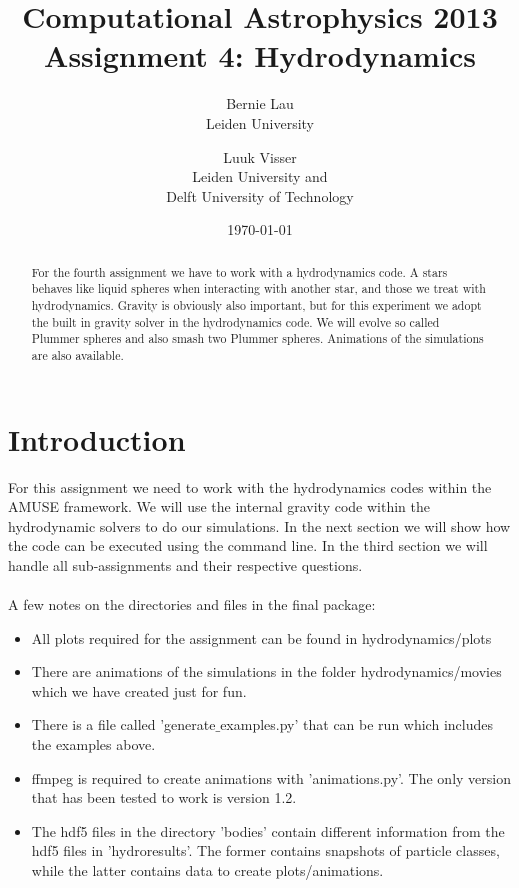 \documentclass[a4paper]{article}
\begin{document}
\title{Computational Astrophysics 2013 \\
Assignment 4: Hydrodynamics}
\author{Bernie Lau\\
        Leiden University
		\and
		Luuk Visser\\
		Leiden University and\\
        Delft University of Technology}
\date{\today}
\maketitle

\begin{abstract}
\centering
For the fourth assignment we have to work with a hydrodynamics code. A stars behaves like liquid spheres when interacting with another star, and those we treat with hydrodynamics. Gravity is obviously also important, but for this experiment we adopt the built in gravity solver in the hydrodynamics code. We will evolve so called Plummer spheres and also smash two Plummer spheres. Animations of the simulations are also available.
\end{abstract}
\newpage

\section{Introduction}
\label{sec:introduction}
For this assignment we need to work with the hydrodynamics codes within the AMUSE framework. We will use the internal gravity code within the hydrodynamic solvers to do our simulations. In the next section we will show how the code can be executed using the command line. In the third section we will handle all sub-assignments and their respective questions.\\
\\
A few notes on the directories and files in the final package:
\begin{itemize}
  \item All plots required for the assignment can be found in hydrodynamics/plots
  \item There are animations of the simulations in the folder hydrodynamics/movies which we have created just for fun.
  \item There is a file called 'generate$\_$examples.py' that can be run which includes the examples above.
  \item ffmpeg is required to create animations with 'animations.py'. The only version that has been tested to work is version 1.2.
  \item The hdf5 files in the directory 'bodies' contain different information from the hdf5 files in 'hydroresults'. The former contains snapshots of particle classes, while the latter contains data to create plots/animations.
\end{itemize}
\newpage
\end{document}
